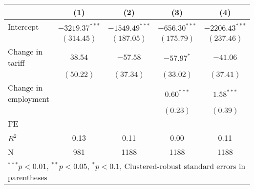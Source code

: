 
\begin{tabular}{l c c c c }
\hline
 & (1) & (2) & (3) & (4) \\
\hline
Intercept & $-3219.37^{***}$ & $-1549.49^{***}$ & $-656.30^{***}$ & $-2206.43^{***}$ \\
            & $(314.45)$       & $(187.05)$       & $(175.79)$      & $(237.46)$       \\
Change in tariff     & $38.54$          & $-57.58$         & $-57.97^{*}$    & $-41.06$         \\
            & $(50.22)$        & $(37.34)$        & $(33.02)$       & $(37.41)$        \\
Change in employment     &                  &                  & $0.60^{***}$    & $1.58^{***}$     \\
            &                  &                  & $(0.23)$        & $(0.39)$         \\
\hline
FE          &                &                &                &                \\ 
\hline
$R^2$       & 0.13             & 0.11             & 0.00            & 0.11             \\
N           & 981              & 1188             & 1188            & 1188             \\
\hline
\multicolumn{5}{l}{\scriptsize{$^{***}p<0.01$, $^{**}p<0.05$, $^*p<0.1$, Clustered-robust standard errors in parentheses}}
\end{tabular}
